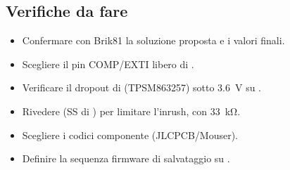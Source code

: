 \subsection{Verifiche da fare}
\begin{itemize}[nosep]
  \item Confermare con Brik81 la soluzione proposta e i valori finali.
  \item Scegliere il pin COMP/EXTI libero di .
  \item Verificare il dropout di  (TPSM863257) sotto \SI{3.6}{\volt} su .
  \item Rivedere  (SS di ) per limitare l'inrush, con  \SI{33}{\kilo\ohm}.
  \item Scegliere i codici componente (JLCPCB/Mouser).
  \item Definire la sequenza firmware di salvataggio su .
\end{itemize}

